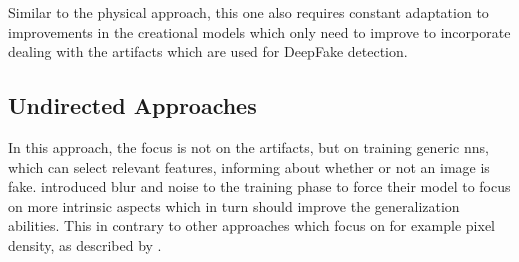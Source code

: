 \par
Similar to the physical approach, this one also requires constant adaptation to
improvements in the creational models which only need to improve to incorporate
dealing with the artifacts which are used for DeepFake detection\cite{mirsky_creation_2020}.

\subsection{Undirected Approaches}
In this approach, the focus is not on the artifacts, but on training generic
\glspl{nn}, which can select relevant features, informing about whether or not
an image is fake. 
\textcite{xuan_generalization_2019} introduced blur and noise to the training phase
to force their model to focus on more intrinsic aspects which in turn should improve
the generalization abilities.
This in contrary to other approaches which focus on for example pixel density,
as described by \textcite{mirsky_creation_2020}.



